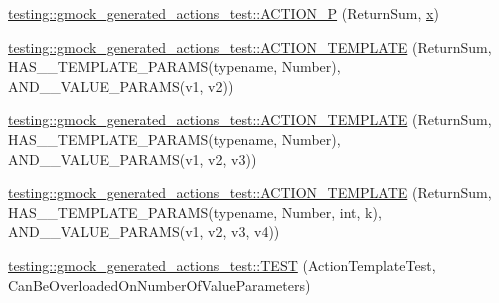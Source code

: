\begin{DoxyCompactItemize}
\item 
\mbox{\hyperlink{namespacetesting_1_1gmock__generated__actions__test_acae7628c76df0e3b54ea80459fe3cf60}{testing\+::gmock\+\_\+generated\+\_\+actions\+\_\+test\+::\+A\+C\+T\+I\+O\+N\+\_\+P}} (Return\+Sum, \mbox{\hyperlink{_obj__test_2lib_2googletest-master_2googlemock_2test_2gmock-matchers__test_8cc_a6150e0515f7202e2fb518f7206ed97dc}{x}})
\item 
\mbox{\hyperlink{namespacetesting_1_1gmock__generated__actions__test_a0d95dcce021580cf2a2af2a91348a01b}{testing\+::gmock\+\_\+generated\+\_\+actions\+\_\+test\+::\+A\+C\+T\+I\+O\+N\+\_\+\+T\+E\+M\+P\+L\+A\+TE}} (Return\+Sum, H\+A\+S\+\_\+\_\+\+T\+E\+M\+P\+L\+A\+T\+E\+\_\+\+P\+A\+R\+A\+MS(typename, Number), A\+N\+D\+\_\+\_\+\+V\+A\+L\+U\+E\+\_\+\+P\+A\+R\+A\+MS(v1, v2))
\item 
\mbox{\hyperlink{namespacetesting_1_1gmock__generated__actions__test_a5241672e22af49093d3601ac42c9a5ca}{testing\+::gmock\+\_\+generated\+\_\+actions\+\_\+test\+::\+A\+C\+T\+I\+O\+N\+\_\+\+T\+E\+M\+P\+L\+A\+TE}} (Return\+Sum, H\+A\+S\+\_\+\_\+\+T\+E\+M\+P\+L\+A\+T\+E\+\_\+\+P\+A\+R\+A\+MS(typename, Number), A\+N\+D\+\_\+\_\+\+V\+A\+L\+U\+E\+\_\+\+P\+A\+R\+A\+MS(v1, v2, v3))
\item 
\mbox{\hyperlink{namespacetesting_1_1gmock__generated__actions__test_a03e55dabaa60ff2cda602c702ef3ff76}{testing\+::gmock\+\_\+generated\+\_\+actions\+\_\+test\+::\+A\+C\+T\+I\+O\+N\+\_\+\+T\+E\+M\+P\+L\+A\+TE}} (Return\+Sum, H\+A\+S\+\_\+\_\+\+T\+E\+M\+P\+L\+A\+T\+E\+\_\+\+P\+A\+R\+A\+MS(typename, Number, int, k), A\+N\+D\+\_\+\_\+\+V\+A\+L\+U\+E\+\_\+\+P\+A\+R\+A\+MS(v1, v2, v3, v4))
\item 
\mbox{\hyperlink{namespacetesting_1_1gmock__generated__actions__test_aa84c5b4f29e052340459e12649ce7209}{testing\+::gmock\+\_\+generated\+\_\+actions\+\_\+test\+::\+T\+E\+ST}} (Action\+Template\+Test, Can\+Be\+Overloaded\+On\+Number\+Of\+Value\+Parameters)
\end{DoxyCompactItemize}
